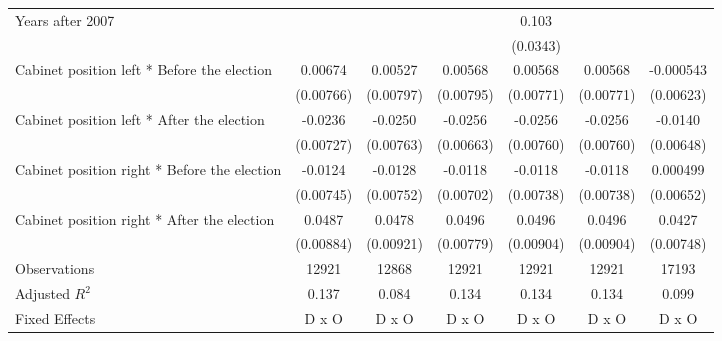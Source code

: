\begin{table}[htbp]
\begin{tabular}{l*{6}{c}}
Years after 2007    &                     &                     &                     &       0.103\sym{**} &                     &                     \\
                    &                     &                     &                     &    (0.0343)         &                     &                     \\
[1em]
Cabinet position left * Before the election&     0.00674         &     0.00527         &     0.00568         &     0.00568         &     0.00568         &   -0.000543         \\
                    &   (0.00766)         &   (0.00797)         &   (0.00795)         &   (0.00771)         &   (0.00771)         &   (0.00623)         \\
[1em]
Cabinet position left * After the election&     -0.0236\sym{**} &     -0.0250\sym{**} &     -0.0256\sym{***}&     -0.0256\sym{**} &     -0.0256\sym{**} &     -0.0140\sym{*}  \\
                    &   (0.00727)         &   (0.00763)         &   (0.00663)         &   (0.00760)         &   (0.00760)         &   (0.00648)         \\
[1em]
Cabinet position right * Before the election&     -0.0124         &     -0.0128         &     -0.0118         &     -0.0118         &     -0.0118         &    0.000499         \\
                    &   (0.00745)         &   (0.00752)         &   (0.00702)         &   (0.00738)         &   (0.00738)         &   (0.00652)         \\
[1em]
Cabinet position right * After the election&      0.0487\sym{***}&      0.0478\sym{***}&      0.0496\sym{***}&      0.0496\sym{***}&      0.0496\sym{***}&      0.0427\sym{***}\\
                    &   (0.00884)         &   (0.00921)         &   (0.00779)         &   (0.00904)         &   (0.00904)         &   (0.00748)         \\
\hline
Observations        &       12921         &       12868         &       12921         &       12921         &       12921         &       17193         \\
Adjusted \(R^{2}\)  &       0.137         &       0.084         &       0.134         &       0.134         &       0.134         &       0.099         \\
Fixed Effects       &       D x O         &       D x O         &       D x O         &       D x O         &       D x O         &       D x O         \\

\end{tabular}
\end{table}
